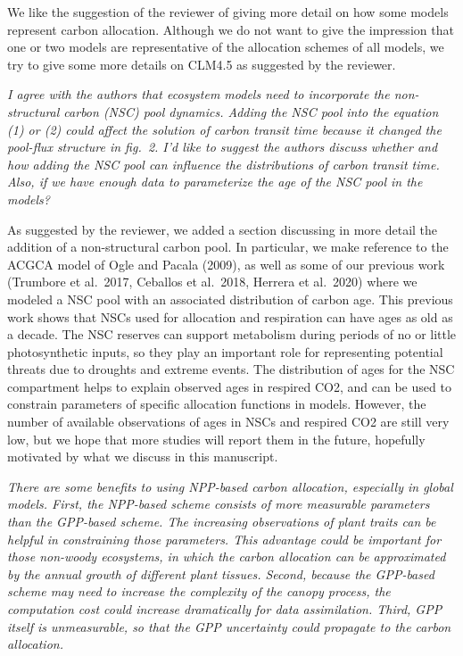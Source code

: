 We like the suggestion of the reviewer of giving more detail on how some
models represent carbon allocation. Although we do not want to give the
impression that one or two models are representative of the allocation
schemes of all models, we try to give some more details on CLM4.5 as
suggested by the reviewer.

\emph{I agree with the authors that ecosystem models need to incorporate
the non-structural carbon (NSC) pool dynamics. Adding the NSC pool into
the equation (1) or (2) could affect the solution of carbon transit time
because it changed the pool-flux structure in fig.~2. I'd like to
suggest the authors discuss whether and how adding the NSC pool can
influence the distributions of carbon transit time. Also, if we have
enough data to parameterize the age of the NSC pool in the models?}

As suggested by the reviewer, we added a section discussing in more
detail the addition of a non-structural carbon pool. In particular, we
make reference to the ACGCA model of Ogle and Pacala (2009), as well as
some of our previous work (Trumbore et al.~2017, Ceballos et al.~2018,
Herrera et al.~2020) where we modeled a NSC pool with an associated
distribution of carbon age. This previous work shows that NSCs used for
allocation and respiration can have ages as old as a decade. The NSC
reserves can support metabolism during periods of no or little
photosynthetic inputs, so they play an important role for representing
potential threats due to droughts and extreme events. The distribution
of ages for the NSC compartment helps to explain observed ages in
respired CO2, and can be used to constrain parameters of specific
allocation functions in models. However, the number of available
observations of ages in NSCs and respired CO2 are still very low, but we
hope that more studies will report them in the future, hopefully
motivated by what we discuss in this manuscript.

\emph{There are some benefits to using NPP-based carbon allocation,
especially in global models. First, the NPP-based scheme consists of
more measurable parameters than the GPP-based scheme. The increasing
observations of plant traits can be helpful in constraining those
parameters. This advantage could be important for those non-woody
ecosystems, in which the carbon allocation can be approximated by the
annual growth of different plant tissues. Second, because the GPP-based
scheme may need to increase the complexity of the canopy process, the
computation cost could increase dramatically for data assimilation.
Third, GPP itself is unmeasurable, so that the GPP uncertainty could
propagate to the carbon allocation.}

